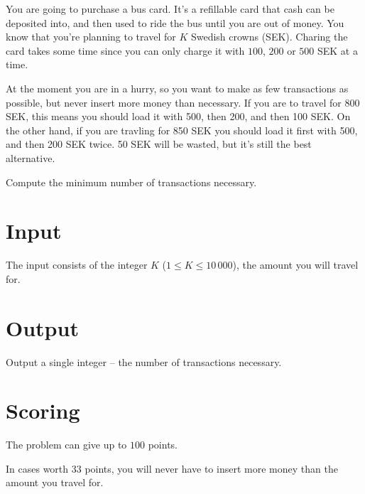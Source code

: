 You are going to purchase a bus card.
It's a refillable card that cash can be deposited into, and then used to ride the bus until you are out of money.
You know that you're planning to travel for $K$ Swedish crowns (SEK).
Charing the card takes some time since you can only charge it with $100$, $200$ or $500$ SEK at a time.

At the moment you are in a hurry, so you want to make as few transactions as possible, but never insert more money than necessary.
If you are to travel for 800 SEK, this means you should load it with 500, then 200, and then 100 SEK.
On the other hand, if you are travling for 850 SEK you should load it first with 500, and then 200 SEK twice.
50 SEK will be wasted, but it's still the best alternative.

Compute the minimum number of transactions necessary.

\section*{Input}
The input consists of the integer $K$ ($1 \le K \le 10\,000$), the amount you will travel for.

\section*{Output}
Output a single integer -- the number of transactions necessary.

\section*{Scoring}
The problem can give up to $100$ points.

In cases worth $33$ points, you will never have to insert more money than the amount you travel for.
